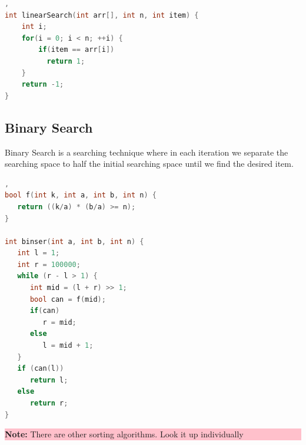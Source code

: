 \begin{lstlisting}[language=c,caption=Linear Search Implementation], 
int linearSearch(int arr[], int n, int item) {
    int i;
    for(i = 0; i < n; ++i) {
        if(item == arr[i])
          return 1;
    }
    return -1;
}
\end{lstlisting}   

\subsection{Binary Search}
Binary Search is a searching technique where in each iteration we separate the searching space to half the initial searching space
until we find the desired item.

\begin{lstlisting}[language=c,caption=Binary Search Implementation],   
bool f(int k, int a, int b, int n) {
   return ((k/a) * (b/a) >= n);
}

int binser(int a, int b, int n) {
   int l = 1;
   int r = 100000;
   while (r - l > 1) {
      int mid = (l + r) >> 1;
      bool can = f(mid);
      if(can)
         r = mid;
      else
         l = mid + 1;
   }
   if (can(l))
      return l;
   else
      return r;
}
\end{lstlisting}

\begin{center}
    \colorbox{pink}{\parbox{0.8\linewidth}{\textbf{Note:} There are other sorting algorithms. Look it up individually}}
\end{center}

